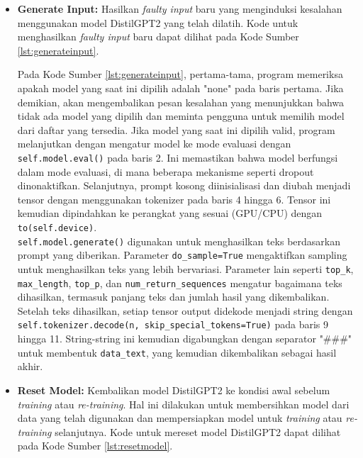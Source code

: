 \begin{enumerate}[topsep=0pt]
\begin{itemize}
      \item \textbf{Generate Input:} Hasilkan \emph{faulty input} baru yang menginduksi kesalahan menggunakan model DistilGPT2 yang telah dilatih.
      Kode untuk menghasilkan \emph{faulty input} baru dapat dilihat pada Kode Sumber \ref{lst:generateinput}.

      

      Pada Kode Sumber \ref{lst:generateinput}, pertama-tama, program memeriksa apakah model yang saat ini dipilih adalah "none" pada baris pertama. Jika demikian, akan mengembalikan pesan kesalahan yang menunjukkan bahwa tidak ada model yang dipilih dan meminta pengguna untuk memilih model dari daftar yang tersedia.
      Jika model yang saat ini dipilih valid, program melanjutkan dengan mengatur model ke mode evaluasi dengan \texttt{self.model.eval()} pada baris 2. Ini memastikan bahwa model berfungsi dalam mode evaluasi, di mana beberapa mekanisme seperti dropout dinonaktifkan.
      Selanjutnya, prompt kosong diinisialisasi dan diubah menjadi tensor dengan menggunakan tokenizer pada baris 4 hingga 6. Tensor ini kemudian dipindahkan ke perangkat yang sesuai (GPU/CPU) dengan \texttt{to(self.device)}.
      \\

      \texttt{self.model.generate()} digunakan untuk menghasilkan teks berdasarkan prompt yang diberikan. Parameter \texttt{do\_sample=True} mengaktifkan sampling untuk menghasilkan teks yang lebih bervariasi. Parameter lain seperti \texttt{top\_k}, \texttt{max\_length}, \texttt{top\_p}, dan \texttt{num\_return\_sequences} mengatur bagaimana teks dihasilkan, termasuk panjang teks dan jumlah hasil yang dikembalikan.
      Setelah teks dihasilkan, setiap tensor output didekode menjadi string dengan \texttt{self.tokenizer.decode(n, skip\_special\_tokens=True)} pada baris 9 hingga 11. String-string ini kemudian digabungkan dengan separator "\#\#\#" untuk membentuk \texttt{data\_text}, yang kemudian dikembalikan sebagai hasil akhir.



      \item \textbf{Reset Model:} Kembalikan model DistilGPT2 ke kondisi awal sebelum \emph{training} atau \emph{re-training}.
      Hal ini dilakukan untuk membersihkan model dari data yang telah digunakan dan mempersiapkan model untuk \emph{training} atau \emph{re-training} selanjutnya.
      Kode untuk mereset model DistilGPT2 dapat dilihat pada Kode Sumber \ref{lst:resetmodel}.


\end{itemize}
\end{enumerate}
